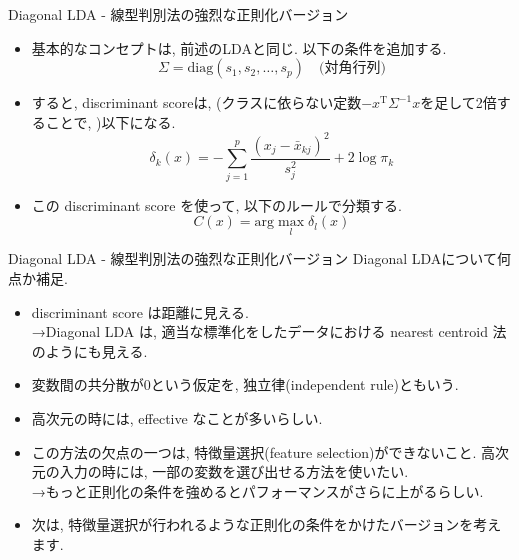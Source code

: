 \documentclass[dvipdfmx,8pt]{beamer}
\begin{document}
  \begin{frame}{Diagonal LDA - 線型判別法の強烈な正則化バージョン}
    \begin{itemize}
      \item 基本的なコンセプトは, 前述のLDAと同じ. 以下の条件を追加する.
        \[
          \Sigma = \mathrm{diag}(s_1, s_2, \dots , s_p) \quad \mbox{(対角行列)}
        \]
      \item すると, discriminant scoreは, (クラスに依らない定数$-x^\mathrm{T}\Sigma^{-1}x$を足して2倍することで, )以下になる.
        \[
          \delta_k(x)=-\sum_{j=1}^p\frac{(x_j-\bar{x}_{kj})^2}{s_j^2}+2\log\pi_k
        \]
      \item この discriminant score を使って, 以下のルールで分類する.
        \[
          C(x)=\mathrm{arg}\max_l\delta_l(x)
        \]
    \end{itemize}
  \end{frame}
  \begin{frame}{Diagonal LDA - 線型判別法の強烈な正則化バージョン}
    Diagonal LDAについて何点か補足.
    \begin{itemize}
      \item discriminant score は距離に見える.\\
        →Diagonal LDA は, 適当な標準化をしたデータにおける nearest centroid 法のようにも見える.
      \item 変数間の共分散が$0$という仮定を, 独立律(independent rule)ともいう.
      \item 高次元の時には, effective なことが多いらしい.
      \item この方法の欠点の一つは, 特徴量選択(feature selection)ができないこと. 高次元の入力の時には, 一部の変数を選び出せる方法を使いたい. \\
        →もっと正則化の条件を強めるとパフォーマンスがさらに上がるらしい.
      \item 次は, 特徴量選択が行われるような正則化の条件をかけたバージョンを考えます.
    \end{itemize}
  \end{frame}
\end{document}
